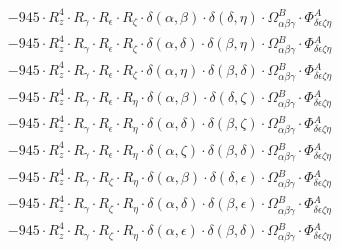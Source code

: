 \documentclass{article}
\begin{document}
\begin{equation}
\begin{array}{c}
 \\[0.2em] 		 - 945 \cdot R_{z}^{4} \cdot R_{\gamma{}} \cdot R_{\epsilon{}} \cdot R_{\zeta{}} \cdot \delta{}\left(\alpha{}, \beta{}\right) \cdot \delta{}\left(\delta{}, \eta{}\right) \cdot \Omega{}^{B}_{\alpha{}\beta{}\gamma{}} \cdot \Phi{}^{A}_{\delta{}\epsilon{}\zeta{}\eta{}} 
 \\[0.2em] 		 - 945 \cdot R_{z}^{4} \cdot R_{\gamma{}} \cdot R_{\epsilon{}} \cdot R_{\zeta{}} \cdot \delta{}\left(\alpha{}, \delta{}\right) \cdot \delta{}\left(\beta{}, \eta{}\right) \cdot \Omega{}^{B}_{\alpha{}\beta{}\gamma{}} \cdot \Phi{}^{A}_{\delta{}\epsilon{}\zeta{}\eta{}} 
 \\[0.2em] 		 - 945 \cdot R_{z}^{4} \cdot R_{\gamma{}} \cdot R_{\epsilon{}} \cdot R_{\zeta{}} \cdot \delta{}\left(\alpha{}, \eta{}\right) \cdot \delta{}\left(\beta{}, \delta{}\right) \cdot \Omega{}^{B}_{\alpha{}\beta{}\gamma{}} \cdot \Phi{}^{A}_{\delta{}\epsilon{}\zeta{}\eta{}} 
 \\[0.2em] 		 - 945 \cdot R_{z}^{4} \cdot R_{\gamma{}} \cdot R_{\epsilon{}} \cdot R_{\eta{}} \cdot \delta{}\left(\alpha{}, \beta{}\right) \cdot \delta{}\left(\delta{}, \zeta{}\right) \cdot \Omega{}^{B}_{\alpha{}\beta{}\gamma{}} \cdot \Phi{}^{A}_{\delta{}\epsilon{}\zeta{}\eta{}} 
 \\[0.2em] 		 - 945 \cdot R_{z}^{4} \cdot R_{\gamma{}} \cdot R_{\epsilon{}} \cdot R_{\eta{}} \cdot \delta{}\left(\alpha{}, \delta{}\right) \cdot \delta{}\left(\beta{}, \zeta{}\right) \cdot \Omega{}^{B}_{\alpha{}\beta{}\gamma{}} \cdot \Phi{}^{A}_{\delta{}\epsilon{}\zeta{}\eta{}} 
 \\[0.2em] 		 - 945 \cdot R_{z}^{4} \cdot R_{\gamma{}} \cdot R_{\epsilon{}} \cdot R_{\eta{}} \cdot \delta{}\left(\alpha{}, \zeta{}\right) \cdot \delta{}\left(\beta{}, \delta{}\right) \cdot \Omega{}^{B}_{\alpha{}\beta{}\gamma{}} \cdot \Phi{}^{A}_{\delta{}\epsilon{}\zeta{}\eta{}} 
 \\[0.2em] 		 - 945 \cdot R_{z}^{4} \cdot R_{\gamma{}} \cdot R_{\zeta{}} \cdot R_{\eta{}} \cdot \delta{}\left(\alpha{}, \beta{}\right) \cdot \delta{}\left(\delta{}, \epsilon{}\right) \cdot \Omega{}^{B}_{\alpha{}\beta{}\gamma{}} \cdot \Phi{}^{A}_{\delta{}\epsilon{}\zeta{}\eta{}} 
 \\[0.2em] 		 - 945 \cdot R_{z}^{4} \cdot R_{\gamma{}} \cdot R_{\zeta{}} \cdot R_{\eta{}} \cdot \delta{}\left(\alpha{}, \delta{}\right) \cdot \delta{}\left(\beta{}, \epsilon{}\right) \cdot \Omega{}^{B}_{\alpha{}\beta{}\gamma{}} \cdot \Phi{}^{A}_{\delta{}\epsilon{}\zeta{}\eta{}} 
 \\[0.2em] 		 - 945 \cdot R_{z}^{4} \cdot R_{\gamma{}} \cdot R_{\zeta{}} \cdot R_{\eta{}} \cdot \delta{}\left(\alpha{}, \epsilon{}\right) \cdot \delta{}\left(\beta{}, \delta{}\right) \cdot \Omega{}^{B}_{\alpha{}\beta{}\gamma{}} \cdot \Phi{}^{A}_{\delta{}\epsilon{}\zeta{}\eta{}} 

\end{array}
\end{equation}
\end{document}
